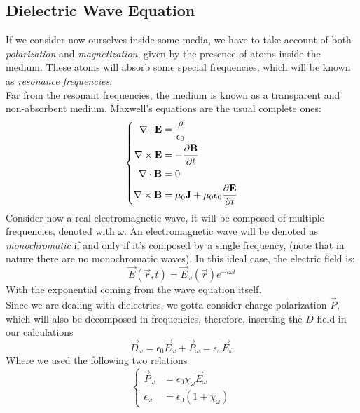 \documentclass[../electromagnetism.tex]{subfiles}
\begin{document}
\subsection{Dielectric Wave Equation}
If we consider now ourselves inside some media, we have to take account of both \textit{polarization} and \textit{magnetization}, given by the presence of atoms inside the medium. These atoms will absorb some special frequencies, which will be known as \textit{resonance frequencies}.\\
Far from the resonant frequencies, the medium is known as a transparent and non-absorbent medium. Maxwell's equations are the usual complete ones:
\begin{equation}
	\left\{ \begin{aligned}
			\nabla\cdot\mathbf{E}&= \frac{\rho}{\epsilon_0}\\
			\nabla\times\mathbf{E}&= -\pdv{\mathbf{B}}{t}\\
			\nabla\cdot\mathbf{B}&= 0\\
			\nabla\times\mathbf{B}&= \mu_0\mathbf{J}+\mu_0\epsilon_0\pdv{\mathbf{E}}{t}
	\end{aligned}\right.
	\label{eq:mwgeneralmedia}
\end{equation}
Consider now a real electromagnetic wave, it will be composed of multiple frequencies, denoted with $\omega$. An electromagnetic wave will be denoted as \textit{monochromatic} if and only if it's composed by a single frequency, (note that in nature there are no monochromatic waves). In this ideal case, the electric field is:
\begin{equation}
	\vec{E}(\vec{r},t)=\vec{E}_\omega(\vec{r})e^{-i\omega t}
	\label{eq:frequencydec.waves}
\end{equation}
With the exponential coming from the wave equation itself.\\
Since we are dealing with dielectrics, we gotta consider charge polarization $\vec{P}$, which will also be decomposed in frequencies, therefore, inserting the $D$ field in our calculations
\begin{equation}
	\vec{D}_\omega=\epsilon_0\vec{E}_\omega+\vec{P}_\omega=\epsilon_\omega\vec{E}_\omega
	\label{eq:dvector.waves}
\end{equation}
Where we used the following two relations
\begin{equation}
	\left\{\begin{aligned}
			\vec{P}_\omega&= \epsilon_0\chi_\omega\vec{E}_\omega\\
			\epsilon_\omega&= \epsilon_0(1+\chi_\omega)
	\end{aligned}\right.
	\label{eq:dtoe.waves}
\end{equation}
\end{document}
